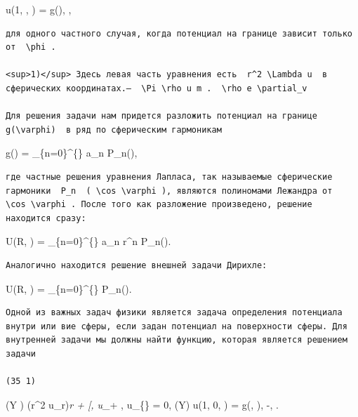 \documentclass[
  ukrainian,
]{article}
\begin{document}
u(1, \theta, \varphi) = g(\varphi),  \le \varphi \le \pi,

\begin{verbatim}
для одного частного случая, когда потенциал на границе зависит только от  \phi .

<sup>1)</sup> Здесь левая часть уравнения есть  r^2 \Lambda u  в сферических координатах.—  \Pi \rho u m .  \rho e \partial_v 

Для решения задачи нам придется разложить потенциал на границе  g(\varphi)  в ряд по сферическим гармоникам
\end{verbatim}

g(\varphi) = \sum\_\{n=0\}\^{}\{\infty\} a\_n P\_n(\cos \varphi),

\begin{verbatim}
где частные решения уравнения Лапласа, так называемые сферические гармоники  P_n  ( \cos \varphi ), являются полиномами Лежандра от  \cos \varphi . После того как разложение произведено, решение находится сразу:
\end{verbatim}

U(R, \varphi) = \sum\_\{n=0\}\^{}\{\infty\} a\_n r\^{}n
P\_n(\cos \varphi).

\begin{verbatim}
Аналогично находится решение внешней задачи Дирихле:
\end{verbatim}

U(R, \varphi) = \sum\_\{n=0\}\^{}\{\infty\} 
P\_n(\cos \varphi).

\begin{verbatim}
Одной из важных задач физики является задача определения потенциала внутри или вие сферы, если задан потенциал на поверхности сферы. Для внутренней задачи мы должны найти функцию, которая является решением задачи

(35 1)
\end{verbatim}

(Y \Psi \Pi) \quad (r\^{}2 u\_r)\emph{r + 
{[}\sin \varphi , u\_\varphi{]}}\varphi +  ,
u\_\{\theta\theta\} = 0, (\Gamma Y) \quad u(1, 0, \varphi) = g(\theta,
\varphi), \quad -\pi \leqslant \theta \leqslant \pi, 
\leqslant \varphi \leqslant \pi.
\end{document}
